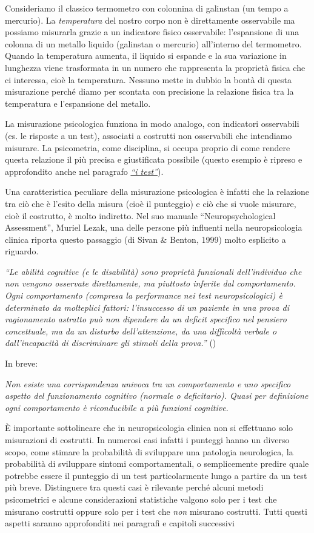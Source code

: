 \documentclass[
  italian,
  letterpaper,
  paper=6in:9in,
  pagesize=pdftex,
  headinclude=on,
  footinclude=on,
  11pt]{scrbook}
\begin{document}
Consideriamo il classico termometro con colonnina di galinstan (un tempo
a mercurio). La \emph{temperatura} del nostro corpo non è direttamente
osservabile ma possiamo misurarla grazie a un indicatore fisico
osservabile: l'espansione di una colonna di un metallo liquido
(galinstan o mercurio) all'interno del termometro. Quando la temperatura
aumenta, il liquido si espande e la sua variazione in lunghezza viene
trasformata in un numero che rappresenta la proprietà fisica che ci
interessa, cioè la temperatura. Nessuno mette in dubbio la bontà di
questa misurazione perché diamo per scontata con precisione la relazione
fisica tra la temperatura e l'espansione del metallo.

La misurazione psicologica funziona in modo analogo, con indicatori
osservabili (es. le risposte a un test), associati a costrutti non
osservabili che intendiamo misurare. La psicometria, come disciplina, si
occupa proprio di come rendere questa relazione il più precisa e
giustificata possibile (questo esempio è ripreso e approfondito anche
nel paragrafo \hyperref[i-test]{\emph{``i test''}}).

Una caratteristica peculiare della misurazione psicologica è infatti che
la relazione tra ciò che è l'esito della misura (cioè il punteggio) e
ciò che si vuole misurare, cioè il costrutto, è molto indiretto. Nel suo
manuale ``Neuropsychological Assessment'', Muriel Lezak, una delle
persone più influenti nella neuropsicologia clinica riporta questo
passaggio (di Sivan \& Benton, 1999) molto esplicito a riguardo.

\emph{``Le abilità cognitive (e le disabilità) sono proprietà funzionali
dell'individuo che non vengono osservate direttamente, ma piuttosto
inferite dal comportamento. Ogni comportamento (compresa la performance
nei test neuropsicologici) è determinato da molteplici fattori:
l'insuccesso di un paziente in una prova di ragionamento astratto può
non dipendere da un deficit specifico nel pensiero concettuale, ma da un
disturbo dell'attenzione, da una difficoltà verbale o dall'incapacità di
discriminare gli stimoli della prova.''} (\cite{sivan1999cognitive})

In breve:

\emph{Non esiste una corrispondenza univoca tra un comportamento e uno
specifico aspetto del funzionamento cognitivo (normale o deficitario).
Quasi per definizione ogni comportamento è riconducibile a più funzioni
cognitive}.

È importante sottolineare che in neuropsicologia clinica non si
effettuano solo misurazioni di costrutti. In numerosi casi infatti i
punteggi hanno un diverso scopo, come stimare la probabilità di
sviluppare una patologia neurologica, la probabilità di sviluppare
sintomi comportamentali, o semplicemente predire quale potrebbe essere
il punteggio di un test particolarmente lungo a partire da un test più
breve. Distinguere tra questi casi è rilevante perché alcuni metodi
psicometrici e alcune considerazioni statistiche valgono solo per i test
che misurano costrutti oppure solo per i test che \emph{non} misurano
costrutti. Tutti questi aspetti saranno approfonditi nei paragrafi e
capitoli successivi
\end{document}
